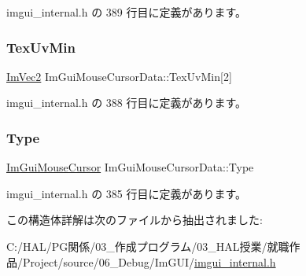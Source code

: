 imgui\+\_\+internal.\+h の 389 行目に定義があります。

\mbox{\label{struct_im_gui_mouse_cursor_data_add35adb991fcfd03ae33c3607aa0c842}} 
\subsubsection{\texorpdfstring{Tex\+Uv\+Min}{TexUvMin}}
{\footnotesize\ttfamily \mbox{\hyperlink{struct_im_vec2}{Im\+Vec2}} Im\+Gui\+Mouse\+Cursor\+Data\+::\+Tex\+Uv\+Min\mbox{[}2\mbox{]}}



 imgui\+\_\+internal.\+h の 388 行目に定義があります。

\mbox{\label{struct_im_gui_mouse_cursor_data_ab58df812a8caf8741415053515b8f347}} 
\subsubsection{\texorpdfstring{Type}{Type}}
{\footnotesize\ttfamily \mbox{\hyperlink{imgui_8h_a9223d6c82bb5d12c2eab5f829ca520ef}{Im\+Gui\+Mouse\+Cursor}} Im\+Gui\+Mouse\+Cursor\+Data\+::\+Type}



 imgui\+\_\+internal.\+h の 385 行目に定義があります。



この構造体詳解は次のファイルから抽出されました\+:\begin{DoxyCompactItemize}
\item 
C\+:/\+H\+A\+L/\+P\+G関係/03\+\_\+作成プログラム/03\+\_\+\+H\+A\+L授業/就職作品/\+Project/source/06\+\_\+\+Debug/\+Im\+G\+U\+I/\mbox{\hyperlink{imgui__internal_8h}{imgui\+\_\+internal.\+h}}\end{DoxyCompactItemize}
